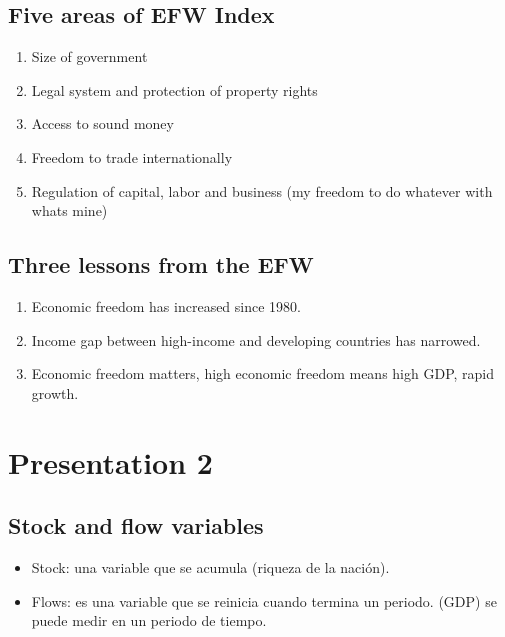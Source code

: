 \documentclass[openany]{book}
\begin{document}
\section{Five areas of EFW Index}
\begin{enumerate}
    \item Size of government 
    \item Legal system and protection of property rights 
    \item Access to sound money 
    \item Freedom to trade internationally 
    \item Regulation of capital, labor and business (my freedom to do whatever with whats mine)
\end{enumerate}

\section{Three lessons from the EFW}
\begin{enumerate}
    \item Economic freedom has increased since 1980.
    \item Income gap between high-income and developing countries has narrowed.
    \item Economic freedom matters, high economic freedom means high GDP, rapid growth. 
\end{enumerate}



\chapter{Presentation 2}
\section{Stock and flow variables}
\begin{itemize}
    \item Stock: una variable que se acumula (riqueza de la nación).
    \item Flows: es una variable que se reinicia cuando termina un periodo. (GDP) se puede medir en un periodo de tiempo.
\end{itemize}
\end{document}
